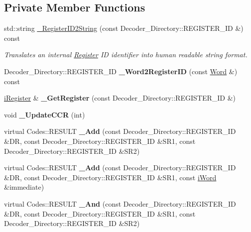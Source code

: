 \subsection*{Private Member Functions}
\begin{DoxyCompactItemize}
\item 
\hypertarget{classWi11_a1dcc11c26d454f639b1a924966ede86c}{
std::string \hyperlink{classWi11_a1dcc11c26d454f639b1a924966ede86c}{\_\-RegisterID2String} (const Decoder\_\-Directory::REGISTER\_\-ID \&) const }
\label{classWi11_a1dcc11c26d454f639b1a924966ede86c}

\begin{DoxyCompactList}\small\item\em Translates an internal \hyperlink{classRegister}{Register} ID identifier into human readable string format. \item\end{DoxyCompactList}\item 
\hypertarget{classWi11_abba9724054093a987468c0b14bf8fcda}{
Decoder\_\-Directory::REGISTER\_\-ID {\bfseries \_\-Word2RegisterID} (const \hyperlink{classWord}{Word} \&) const }
\label{classWi11_abba9724054093a987468c0b14bf8fcda}

\item 
\hypertarget{classWi11_a7b4a726a80ca57b9ce37d73d641b2072}{
\hyperlink{classiRegister}{iRegister} \& {\bfseries \_\-GetRegister} (const Decoder\_\-Directory::REGISTER\_\-ID \&)}
\label{classWi11_a7b4a726a80ca57b9ce37d73d641b2072}

\item 
\hypertarget{classWi11_a55dd619a7cf329849f5a3b22e37d00ed}{
void {\bfseries \_\-UpdateCCR} (int)}
\label{classWi11_a55dd619a7cf329849f5a3b22e37d00ed}

\item 
\hypertarget{classWi11_a90f2c17048a889b52b99ef2334f0ba55}{
virtual Codes::RESULT {\bfseries \_\-Add} (const Decoder\_\-Directory::REGISTER\_\-ID \&DR, const Decoder\_\-Directory::REGISTER\_\-ID \&SR1, const Decoder\_\-Directory::REGISTER\_\-ID \&SR2)}
\label{classWi11_a90f2c17048a889b52b99ef2334f0ba55}

\item 
\hypertarget{classWi11_a9b5e86294f943344021336108309bb52}{
virtual Codes::RESULT {\bfseries \_\-Add} (const Decoder\_\-Directory::REGISTER\_\-ID \&DR, const Decoder\_\-Directory::REGISTER\_\-ID \&SR1, const \hyperlink{classiWord}{iWord} \&immediate)}
\label{classWi11_a9b5e86294f943344021336108309bb52}

\item 
\hypertarget{classWi11_a9b6fb3285c524e01ae94f2204a4b50f1}{
virtual Codes::RESULT {\bfseries \_\-And} (const Decoder\_\-Directory::REGISTER\_\-ID \&DR, const Decoder\_\-Directory::REGISTER\_\-ID \&SR1, const Decoder\_\-Directory::REGISTER\_\-ID \&SR2)}
\label{classWi11_a9b6fb3285c524e01ae94f2204a4b50f1}


\end{DoxyCompactItemize}
